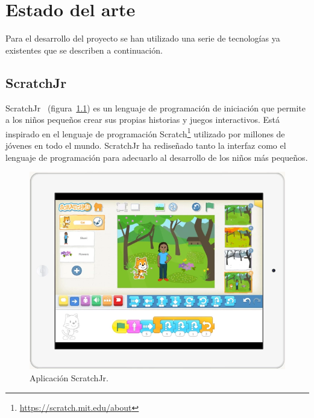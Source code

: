 \documentclass[a4paper, 12pt]{book}
\begin{document}

\cleardoublepage
\chapter{Estado del arte}
\label{chap:estado}

Para el desarrollo del proyecto se han utilizado una serie de tecnologías ya existentes que se describen a continuación.


\section{ScratchJr}
\label{sec:scratchJr}

ScratchJr~\cite{scratchjr,leidl2017programming} (figura~\ref{fig:scratchjr}) es un lenguaje de programación de iniciación que permite a los niños pequeños crear sus propias historias y juegos interactivos.
Está inspirado en el lenguaje de programación Scratch\footnote{\url{https://scratch.mit.edu/about}} utilizado por millones de jóvenes en todo el mundo.
ScratchJr ha rediseñado tanto la interfaz como el lenguaje de programación para adecuarlo al desarrollo de los niños más pequeños.

\begin{figure}[ht]
  \centering
  \includegraphics[width=13cm, keepaspectratio]{img/scratchjr.png}
  \caption{Aplicación ScratchJr.}\label{fig:scratchjr}
\end{figure}
\end{document}

